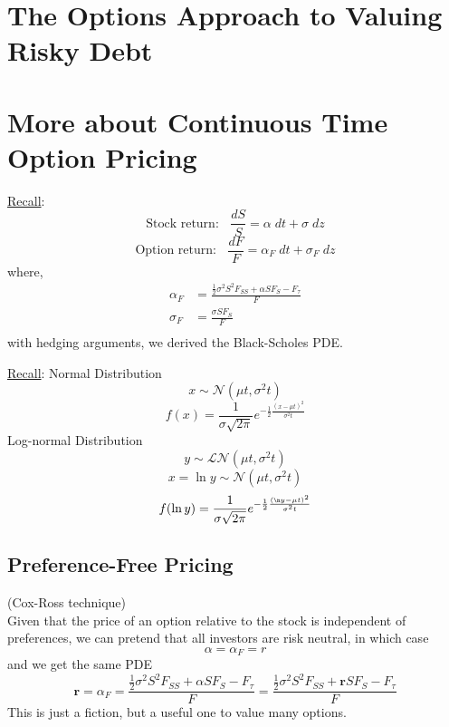 \documentclass[
14pt,notheorems,hyperref={pdfauthor=whatever}
]{beamer}
\begin{document}
\section{The Options Approach to Valuing Risky Debt}


\section{More about Continuous Time Option Pricing}

\begin{frame}
\underline{Recall}:
\[ \text{Stock return: } \;\; \frac{dS}{S} = \alpha\;dt + \sigma\;dz\]
\[ \text{Option return: } \;\; \frac{dF}{F} = \alpha_F\;dt + \sigma_F\;dz\]
where,
\begin{align*}
    \alpha_F &= \frac{\frac{1}{2}\sigma^2 S^2 F_{SS} + \alpha S F_S - F_\tau}{F}\\
    \sigma_F &= \frac{\sigma S F_S}{F}\\
\end{align*}
with hedging arguments, we derived the Black-Scholes PDE.
\end{frame}

\begin{frame}
\underline{Recall}: Normal Distribution\\
\[ x \sim \mathcal{N}(\mu t, \sigma^2 t)\]
\[ f(x) = \frac{1}{\sigma \sqrt{2\pi}} e^{-\frac{1}{2}\frac{(x-\mu t)^2}{\sigma^2 t}}\]
\hfill\break
Log-normal Distribution\\
\[ y \sim \mathcal{LN}(\mu t, \sigma^2 t)\]
\[ x = \ln y \sim \mathcal{N}(\mu t, \sigma^2 t)\]
\[ f(\ln y) = \frac{1}{\sigma \sqrt{2\pi}} e^{-\frac{1}{2}\frac{(\n y-\mu t)^2}{\sigma^2 t}}\]
\end{frame}

\subsection{Preference-Free Pricing}
\begin{frame}
(Cox-Ross technique)\\
\hfill\break
Given that the price of an option relative to the stock is independent of preferences, we can pretend that all investors are risk neutral, in which case
\[ \alpha = \alpha_F = r\]
and we get the same PDE
\[\bm{r} = \alpha_F = \frac{\frac{1}{2}\sigma^2 S^2 F_{SS} + \alpha S F_S - F_\tau}{F} = \frac{\frac{1}{2}\sigma^2 S^2 F_{SS} + \bm{r}S F_S - F_\tau}{F}\]
This is just a fiction, but a useful one to value many options.\\
\end{frame}
\end{document}
